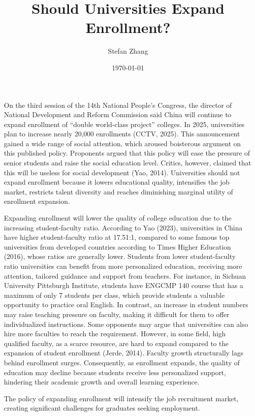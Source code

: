 \documentclass{studentpaper}
\title{Should Universities Expand Enrollment?}
\author{Stefan Zhang}
\institute{Sichuan University-Pittsburgh Institute }
\date{\today}
\begin{document}
\maketitle
\par
On the third session of the 14th National People's Congress, the director of National Development and Reform Commission said China will continue to expand enrollment of “double world-class project” colleges. 
In 2025, universities plan to increase nearly 20,000 enrollments (CCTV, 2025). 
This announcement gained a wide range of social attention, which aroused boisterous argument on this published policy. 
Proponents argued that this policy will ease the pressure of senior students and raise the social education level. Critics, however, claimed that this will be useless for social development (Yao, 2014). 
Universities should not expand enrollment because it lowers educational quality, intensifies the job market, restricts talent diversity and reaches diminishing marginal utility of enrollment expansion.
\par
Expanding enrollment will lower the quality of college education due to the increasing student-faculty ratio. 
According to Yao (2023), universities in China have higher student-faculty ratio at 17.51:1, compared to some famous top universities from developed countries according to Times Higher Education (2016), whose ratios are generally lower. 
Students from lower student-faculty ratio universities can benefit from more personalized education, receiving more attention, tailored guidance and support from teachers. For instance, in Sichuan University Pittsburgh Institute, students have ENGCMP 140 course that has a maximum of only 7 students per class, which provide students a valuable opportunity to practice oral English. 
In contrast, an increase in student numbers may raise teaching pressure on faculty, making it difficult for them to offer individualized instructions. 
Some opponents may argue that universities can also hire more faculties to reach the requirement. 
However, in some field, high qualified faculty, as a scarce resource, are hard to expand compared to the expansion of student enrollment (Jerde, 2014). 
Faculty growth structurally lags behind enrollment surges. Consequently, as enrollment expands, the quality of education may decline because students receive less personalized support, hindering their academic growth and overall learning experience.
\par
The policy of expanding enrollment will intensify the job recruitment market, creating significant challenges for graduates seeking employment. 
\end{document}
